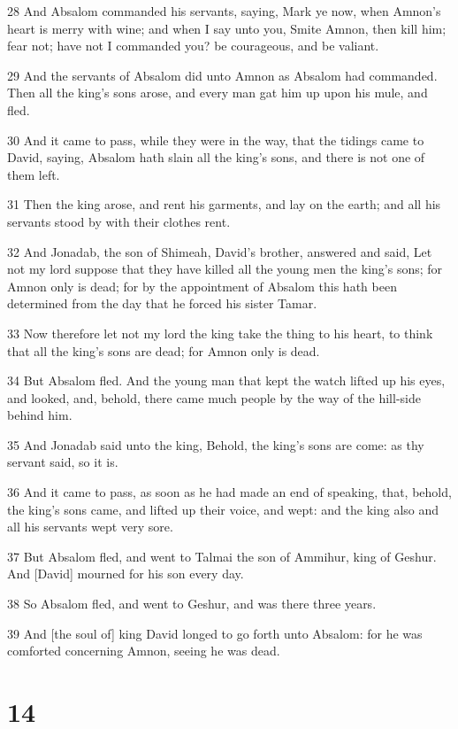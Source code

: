 \par 28 And Absalom commanded his servants, saying, Mark ye now, when Amnon's heart is merry with wine; and when I say unto you, Smite Amnon, then kill him; fear not; have not I commanded you? be courageous, and be valiant.
\par 29 And the servants of Absalom did unto Amnon as Absalom had commanded. Then all the king's sons arose, and every man gat him up upon his mule, and fled.
\par 30 And it came to pass, while they were in the way, that the tidings came to David, saying, Absalom hath slain all the king's sons, and there is not one of them left.
\par 31 Then the king arose, and rent his garments, and lay on the earth; and all his servants stood by with their clothes rent.
\par 32 And Jonadab, the son of Shimeah, David's brother, answered and said, Let not my lord suppose that they have killed all the young men the king's sons; for Amnon only is dead; for by the appointment of Absalom this hath been determined from the day that he forced his sister Tamar.
\par 33 Now therefore let not my lord the king take the thing to his heart, to think that all the king's sons are dead; for Amnon only is dead.
\par 34 But Absalom fled. And the young man that kept the watch lifted up his eyes, and looked, and, behold, there came much people by the way of the hill-side behind him.
\par 35 And Jonadab said unto the king, Behold, the king's sons are come: as thy servant said, so it is.
\par 36 And it came to pass, as soon as he had made an end of speaking, that, behold, the king's sons came, and lifted up their voice, and wept: and the king also and all his servants wept very sore.
\par 37 But Absalom fled, and went to Talmai the son of Ammihur, king of Geshur. And [David] mourned for his son every day.
\par 38 So Absalom fled, and went to Geshur, and was there three years.
\par 39 And [the soul of] king David longed to go forth unto Absalom: for he was comforted concerning Amnon, seeing he was dead.

\chapter{14}

